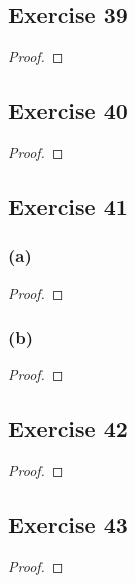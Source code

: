 \documentclass[14pt]{extarticle}
\begin{document}
\subsection{Exercise 39}

\begin{proof}

\end{proof}

\subsection{Exercise 40}

\begin{proof}

\end{proof}

\subsection{Exercise 41}

\subsubsection{(a)}

\begin{proof}

\end{proof}

\subsubsection{(b)}

\begin{proof}

\end{proof}

\subsection{Exercise 42}

\begin{proof}

\end{proof}

\subsection{Exercise 43}

\begin{proof}

\end{proof}
\end{document}
